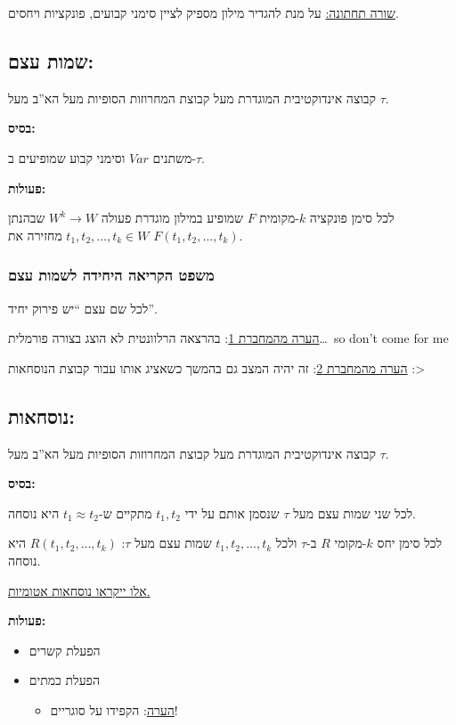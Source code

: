 \documentclass[12pt,a4paper]{article}
\begin{document}
\underline{שורה תחתונה:} על מנת להגדיר מילון מספיק לציין סימני קבועים, פונקציות ויחסים.

\subsection*{שמות עצם:}

קבוצה אינדוקטיבית המוגדרת מעל קבוצת המחרוזות הסופיות מעל הא''ב מעל $\tau$.

\textbf{בסיס:}

משתנים $Var$ וסימני קבוע שמופיעים ב-$\tau$.

\textbf{פעולות:}

לכל סימן פונקציה $k$-מקומית $F$ שמופיע במילון מוגדרת פעולה $W^{k}\rightarrow W$ שבהנתן $t_{1},t_{2},\ldots,t_{k}\in W$ מחזירה את $F(t_{1},t_{2},\ldots,t_{k})$.

\subsubsection*{משפט הקריאה היחידה לשמות עצם}

לכל שם עצם ``יש פירוק יחיד''.

\underline{הערה מהמחברת 1}: בהרצאה הרלוונטית לא הוצג בצורה פורמלית\ldots\ \textenglish{so don't come for me}

\underline{הערה מהמחברת 2}: זה יהיה המצב גם בהמשך כשאציג אותו עבור קבוצת הנוסחאות :>

\subsection*{נוסחאות:}

קבוצה אינדוקטיבית המוגדרת מעל קבוצת המחרוזות הסופיות מעל הא''ב מעל $\tau$.

\textbf{בסיס:}

לכל שני שמות עצם מעל $\tau$ שנסמן אותם על ידי $t_{1},t_{2}$ מתקיים ש-$t_{1}\approx t_{2}$ היא נוסחה.

לכל סימן יחס $k$-מקומי $R$ ב-$\tau$ ולכל $t_{1},t_{2},\ldots,t_{k}$ שמות עצם מעל $\tau$:
$R(t_{1},t_{2},\ldots,t_{k})$ היא נוסחה.

\underline{אלו ייקראו נוסחאות אטומיות.}

\textbf{פעולות:}

\begin{itemize}
  \item הפעלת קשרים
  \item הפעלת כמתים
  \begin{itemize}
    \item \underline{הערה}: הקפידו על סוגריים!
  \end{itemize}
\end{itemize}
\end{document}
